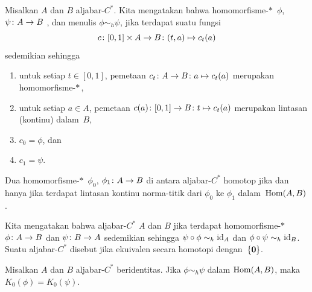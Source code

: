 \begin{defn} Misalkan $A$ dan $B$ aljabar-$C^*$. Kita mengatakan bahwa homomorfisme-$*\,$ $\phi$, $\psi\colon A \rightarrow B$
, dan menulis $\phi \sim_h \psi$, jika terdapat suatu fungsi
   \[ c\colon [0,1] \times A \rightarrow B\colon (t,a) \mapsto c_t(a) \]
sedemikian sehingga
  \begin{enumerate}[label=\rm{(\alph*)}]
     \item untuk setiap $t \in [0,1]$, pemetaan $c_t\colon A \rightarrow B \colon a \mapsto c_t(a)$ merupakan homomorfisme-$*\,$,
     \item untuk setiap $a \in A$, pemetaan $c(a)\colon [0,1] \rightarrow B\colon t \mapsto c_t(a)$ merupakan lintasan (kontinu) dalam~$B$,
     \item $c_0 = \phi$, dan
     \item $c_1 = \psi$.
  \end{enumerate}
\end{defn}

\begin{prop} Dua homomorfisme-$*\,$ $\phi_0$, $\phi_1\colon A \rightarrow B$ di antara aljabar-$C^*$
homotop jika dan hanya jika terdapat lintasan kontinu norma-titik dari $\phi_0$ ke $\phi_1$ dalam~$\operatorname{Hom}(A,B)$.
\end{prop}

\begin{defn} Kita mengatakan bahwa aljabar-$C^*$ $A$ dan $B$
 jika terdapat homomorfisme-$*\,$ $\phi\colon A \rightarrow B$ dan $\psi\colon B \rightarrow A$ sedemikian sehingga $\psi
\circ \phi \sim_h \operatorname{id}_{A}$ dan $\phi \circ \psi \sim_h \operatorname{id}_{B}$. Suatu aljabar-$C^*$ disebut
 jika ekuivalen secara homotopi dengan~$\{\mathbf{0}\}$.
\end{defn}

\begin{prop}\label{0062327} Misalkan $A$ dan $B$ aljabar-$C^*$ beridentitas. Jika $\phi \sim_h \psi$
dalam $\operatorname{Hom}(A,B)$, maka $K_0(\phi) = K_0(\psi)$.
\end{prop}


